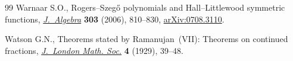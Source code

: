 \documentclass[pdftex]{sigma}
\numberwithin{equation}{section}
\begin{document}
\begin{thebibliography}{99}
Warnaar S.O., Rogers--{S}zeg\H{o} polynomials and {H}all--{L}ittlewood
 symmetric functions,
 \href{https://doi.org/10.1016/j.jalgebra.2006.04.026}{\textit{J.~Algebra}}
 \textbf{303} (2006), 810--830,
 \href{http://arxiv.org/abs/0708.3110}{arXiv:0708.3110}.

Watson G.N., Theorems stated by {R}amanujan~({VII}): {T}heorems on continued
 fractions, \href{https://doi.org/10.1112/jlms/s1-4.1.39}{\textit{J.~London
 Math. Soc.}} \textbf{4} (1929), 39--48.

\end{thebibliography}\LastPageEnding
\end{document}
